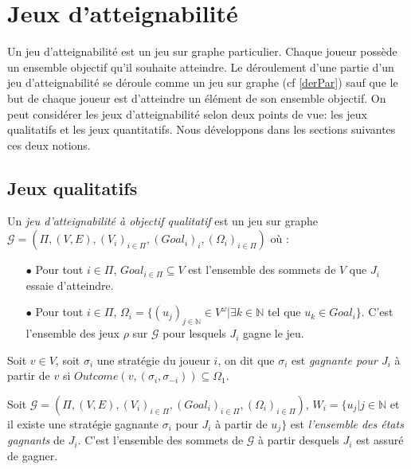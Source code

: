 
\section{Jeux d'atteignabilité}

Un jeu d'atteignabilité est un jeu sur graphe particulier. Chaque joueur possède un ensemble objectif qu'il souhaite atteindre. Le déroulement d'une partie d'un jeu d'atteignabilité se déroule comme un jeu sur graphe (cf \ref{derPar}) sauf que le but de chaque joueur est d'atteindre un élément de son ensemble objectif. On peut considérer les jeux d'atteignabilité selon deux points de vue: les jeux qualitatifs et les jeux quantitatifs. Nous développons dans les sections suivantes ces deux notions.


\subsection{Jeux qualitatifs}
	
	\begin{defi}
		Un \textit{jeu d'atteignabilité à objectif qualitatif} est un jeu sur graphe $\mathcal{G} = (\Pi,(V,E),(V_{i})_{i \in \Pi}, (Goal_{i})_{i},(\Omega _{i})_{i \in \Pi})$ où :
		\begin{enumerate}
			\item[$\bullet$] Pour tout $i \in \Pi$, $Goal_{i\in \Pi} \subseteq V $ est l'ensemble des sommets de $V$ que $J_{i}$ essaie d'atteindre.
			\item[$\bullet$] Pour tout $i \in \Pi$, $\Omega _{i} = \{(u_{j})_{j \in \mathbb{N}}\in V^{\omega}| \exists k \in \mathbb{N}$  tel que $u_{k}\in Goal_{i}\}$. C'est l'ensemble des jeux $\rho$ sur $\mathcal{G}$ pour lesquels $J_{i}$ gagne le jeu.
		\end{enumerate}	
	\end{defi}
	
	
	\begin{defi}
		Soit $v \in V$, soit $\sigma _{i}$ une stratégie du joueur $i$, on dit que $\sigma _{i}$ est \textit{gagnante pour $J_{i}$} à partir de $v$ si $Outcome(v,(\sigma _{i}, \sigma _{-i})) \subseteq \Omega _{1}$.
	\end{defi}
	
	\begin{defi}
		Soit $\mathcal{G} = (\Pi,(V,E),(V_{i})_{i \in \Pi}, (Goal_{i})_{i \in \Pi},(\Omega _{i})_{i \in \Pi})$, $W_{i} = \{ u_{j} |j\in \mathbb{N}$ et il existe une stratégie gagnante $\sigma _{i}$ pour $J_{i}$ à partir de $u_{j}\}$ est \textit{l'ensemble des états gagnants} de $J_{i}$. C'est l'ensemble des sommets de $\mathcal{G}$ à partir desquels $J_{i}$ est assuré de gagner.
	\end{defi}
	
